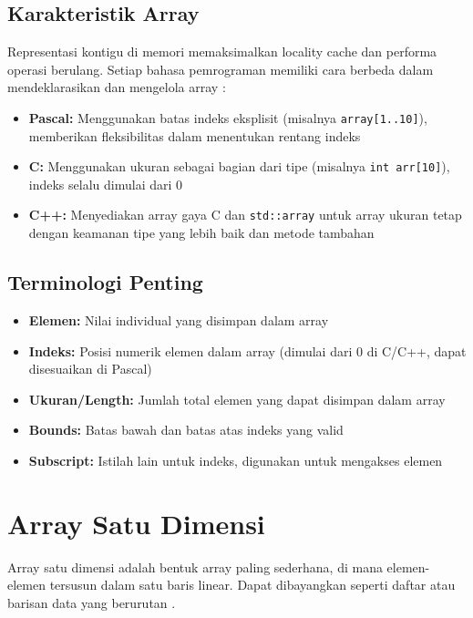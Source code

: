 \documentclass[../main.tex]{subfiles}
\begin{document}
\subsection{Karakteristik Array}
Representasi kontigu di memori memaksimalkan locality cache dan performa operasi berulang. Setiap bahasa pemrograman memiliki cara berbeda dalam mendeklarasikan dan mengelola array \parencite{pascal-tutorial-wikibooks,cpp-std-array,cplusplus-arrays,tambahpinter-array}:

\begin{itemize}
  \item \textbf{Pascal:} Menggunakan batas indeks eksplisit (misalnya \texttt{array[1..10]}), memberikan fleksibilitas dalam menentukan rentang indeks
  \item \textbf{C:} Menggunakan ukuran sebagai bagian dari tipe (misalnya \texttt{int arr[10]}), indeks selalu dimulai dari 0
  \item \textbf{C++:} Menyediakan array gaya C dan \texttt{std::array} untuk array ukuran tetap dengan keamanan tipe yang lebih baik dan metode tambahan
\end{itemize}

\subsection{Terminologi Penting}
\begin{itemize}
  \item \textbf{Elemen:} Nilai individual yang disimpan dalam array
  \item \textbf{Indeks:} Posisi numerik elemen dalam array (dimulai dari 0 di C/C++, dapat disesuaikan di Pascal)
  \item \textbf{Ukuran/Length:} Jumlah total elemen yang dapat disimpan dalam array
  \item \textbf{Bounds:} Batas bawah dan batas atas indeks yang valid
  \item \textbf{Subscript:} Istilah lain untuk indeks, digunakan untuk mengakses elemen
\end{itemize}

\section{Array Satu Dimensi}

Array satu dimensi adalah bentuk array paling sederhana, di mana elemen-elemen tersusun dalam satu baris linear. Dapat dibayangkan seperti daftar atau barisan data yang berurutan \parencite{tutorialspoint-c-arrays,galuhratna-array-c}.
\end{document}
